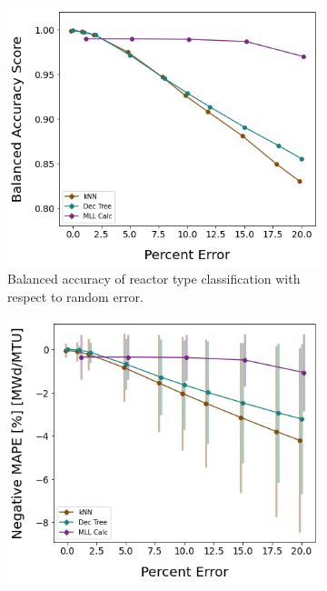\begin{figure}[!htb]
  \centering
  \begin{subfigure}[b]{0.49\textwidth}
    \centering
    \includegraphics[width=\textwidth]{./chapters/exp1/randerr_compare_nuc29_BalAcc_rxtr.png}
    \caption{Balanced accuracy of reactor type classification with respect 
             to random error.}
    \label{fig:randerrA}
  \end{subfigure}
  \hfill
  \begin{subfigure}[b]{0.49\textwidth}
    \centering
    \includegraphics[width=\textwidth]{./chapters/exp1/randerr_compare_nuc29_MAPE_burn.png}

\end{subfigure}
\end{figure}
